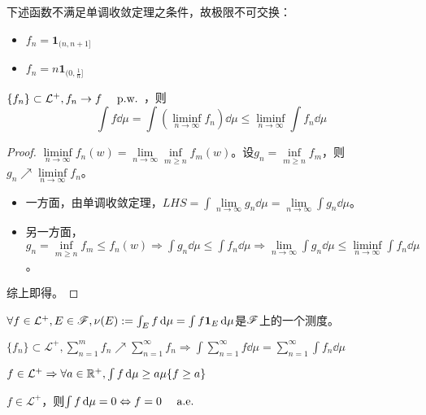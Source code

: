 \documentclass{ctexart}
\begin{document}
\begin{Rmk}
  下述函数不满足单调收敛定理之条件，故极限不可交换：
  \begin{itemize}
  \item $f_{n}=\bm 1_{(n,n+1]}$
  \item $f_{n}=n\bm 1_{(0,\frac{1}{n}]}$
  \end{itemize}
\end{Rmk}

\begin{Thm}
  $\{f_{n}\}\subset \mathcal{L}^{+},f_{n}\to f \quad \text{ p.w. }$，则
  \[\int f\dd\mu=\int(\liminf_{n\to\infty}f_{n})\dd\mu\leq\liminf_{n\to\infty}\int f_{n}\dd\mu\]
\end{Thm}

\begin{proof}
  $\liminf\limits_{n\to\infty} f_{n}(w)=\lim\limits_{n\to\infty}\inf\limits_{m\geq n}f_{m}(w)$。设$g_{n}=\inf\limits_{m\geq n}f_{m}$，则$g_{n}\nearrow \liminf\limits_{n\to\infty} f_{n}$。
  \begin{itemize}
  \item 一方面，由单调收敛定理，$LHS=\int \lim\limits_{n\to\infty}g_{n}\dd\mu=\lim\limits_{n\to\infty}\int g_{n}\dd\mu$。
  \item 另一方面，$g_{n}=\inf\limits_{m\geq n}f_{m}\leq f_{n}(w)\Rightarrow \int g_{n}\dd\mu\leq\int f_{n}\dd\mu\Rightarrow \lim\limits_{n\to\infty}\int g_{n}\dd\mu\leq \liminf\limits_{n\to\infty}\int f_{n}\dd\mu$。
    \end{itemize}
    综上即得。
\end{proof}

\begin{Eg}
  $\forall f\in\mathcal{L}^{+},E\in\mathscr{F},\nu(E):=\int_{E}f\,\mathrm{d}\mu=\int f\bm 1_{E}\,\mathrm{d}\mu$是$\mathscr{F}$上的一个测度。
\end{Eg}

\begin{Eg}
  $\{f_{n}\}\subset \mathcal{L}^{+},\sum_{n=1}^{m}f_{n}\nearrow \sum_{n=1}^{\infty}f_{n}\Rightarrow \int \sum_{n=1}^{\infty}f\dd\mu=\sum_{n=1}^{\infty}\int f_{n}\dd\mu$
\end{Eg}

\begin{Eg}
  $f\in\mathcal{L^{+}}\Rightarrow \forall a\in\mathbb{R}^{+},\int f\,\mathrm{d}\mu\geq a\mu\{f\geq a\}$
\end{Eg}

\begin{Eg}
  $f\in\mathcal{L^{+}}$，则$\int f\,\mathrm{d}\mu=0\Leftrightarrow f=0\quad \text{ a.e. }$
\end{Eg}
\end{document}
